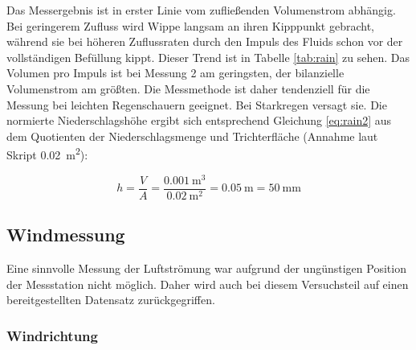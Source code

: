 Das Messergebnis ist in erster Linie vom zufließenden Volumenstrom abhängig. Bei geringerem Zufluss wird Wippe  langsam an ihren Kipppunkt gebracht, während sie bei höheren Zuflussraten durch den Impuls des Fluids schon vor der vollständigen Befüllung kippt. Dieser Trend ist in Tabelle \ref{tab:rain} zu sehen. Das Volumen pro Impuls ist bei Messung 2 am geringsten, der bilanzielle Volumenstrom am größten. Die Messmethode ist daher tendenziell für die Messung bei leichten Regenschauern geeignet. Bei Starkregen versagt sie. 
Die normierte Niederschlagshöhe ergibt sich entsprechend Gleichung \ref{eq:rain2} aus dem Quotienten der Niederschlagsmenge und Trichterfläche (Annahme laut Skript \SI{0,02}{\square\meter}):

\begin{equation}
	\label{eq:rain2}
	h = \frac{V}{A} = \frac{\SI{0,001}{\cubic\meter}}{\SI{0,02}{\square\meter}} = \SI{0,05}{\meter} = \SI{50}{\milli\meter}
\end{equation}

\subsection{Windmessung}
Eine sinnvolle Messung der Luftströmung war aufgrund der ungünstigen Position der Messstation nicht möglich. Daher wird auch bei diesem Versuchsteil auf einen bereitgestellten Datensatz zurückgegriffen.

\subsubsection{Windrichtung}

